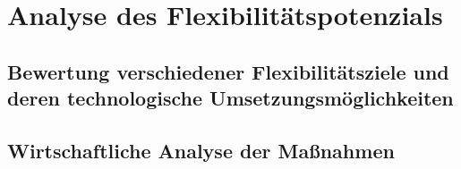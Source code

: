 \section{Analyse des Flexibilitätspotenzials}
\label{ch_06Analyse des Flexibilitätspotenzials}


\subsection{Bewertung verschiedener Flexibilitätsziele und deren technologische Umsetzungsmöglichkeiten}
\label{ch_06Bewertung verschiedener Flexibilitätsziele und deren technologische Umsetzungsmöglichkeiten}

\subsection{Wirtschaftliche Analyse der Maßnahmen}
\label{ch_06Wirtschaftliche Analyse der Maßnahmen}
